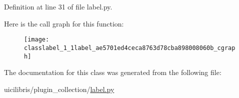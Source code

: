 \-Definition at line 31 of file label.\-py.



\-Here is the call graph for this function\-:
\nopagebreak
\begin{figure}[H]
\begin{center}
\leavevmode
\texttt{[image: classlabel\_1\_1label\_ae5701ed4ceca8763d78cba898008060b\_cgraph]}
\end{center}
\end{figure}




\-The documentation for this class was generated from the following file\-:\begin{DoxyCompactItemize}
\item 
uicilibris/plugin\-\_\-collection/\hyperlink{label_8py}{label.\-py}\end{DoxyCompactItemize}
